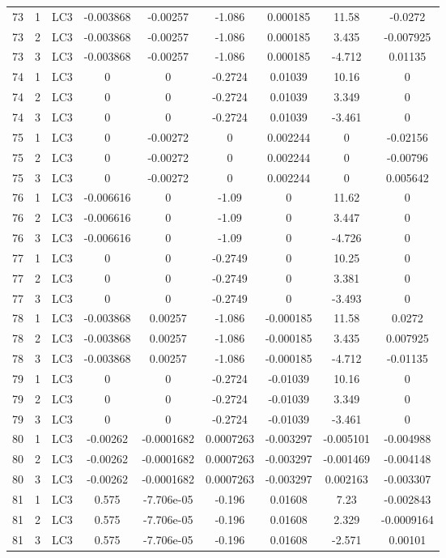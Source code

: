 \documentclass{article}%
\begin{document}
\begin{longtable}{| c c c | c c c c c c |}
73&1&LC3&{-}0.003868&{-}0.00257&{-}1.086&0.000185&11.58&{-}0.0272\\%
73&2&LC3&{-}0.003868&{-}0.00257&{-}1.086&0.000185&3.435&{-}0.007925\\%
73&3&LC3&{-}0.003868&{-}0.00257&{-}1.086&0.000185&{-}4.712&0.01135\\%
74&1&LC3&0&0&{-}0.2724&0.01039&10.16&0\\%
74&2&LC3&0&0&{-}0.2724&0.01039&3.349&0\\%
74&3&LC3&0&0&{-}0.2724&0.01039&{-}3.461&0\\%
75&1&LC3&0&{-}0.00272&0&0.002244&0&{-}0.02156\\%
75&2&LC3&0&{-}0.00272&0&0.002244&0&{-}0.00796\\%
75&3&LC3&0&{-}0.00272&0&0.002244&0&0.005642\\%
76&1&LC3&{-}0.006616&0&{-}1.09&0&11.62&0\\%
76&2&LC3&{-}0.006616&0&{-}1.09&0&3.447&0\\%
76&3&LC3&{-}0.006616&0&{-}1.09&0&{-}4.726&0\\%
77&1&LC3&0&0&{-}0.2749&0&10.25&0\\%
77&2&LC3&0&0&{-}0.2749&0&3.381&0\\%
77&3&LC3&0&0&{-}0.2749&0&{-}3.493&0\\%
78&1&LC3&{-}0.003868&0.00257&{-}1.086&{-}0.000185&11.58&0.0272\\%
78&2&LC3&{-}0.003868&0.00257&{-}1.086&{-}0.000185&3.435&0.007925\\%
78&3&LC3&{-}0.003868&0.00257&{-}1.086&{-}0.000185&{-}4.712&{-}0.01135\\%
79&1&LC3&0&0&{-}0.2724&{-}0.01039&10.16&0\\%
79&2&LC3&0&0&{-}0.2724&{-}0.01039&3.349&0\\%
79&3&LC3&0&0&{-}0.2724&{-}0.01039&{-}3.461&0\\%
80&1&LC3&{-}0.00262&{-}0.0001682&0.0007263&{-}0.003297&{-}0.005101&{-}0.004988\\%
80&2&LC3&{-}0.00262&{-}0.0001682&0.0007263&{-}0.003297&{-}0.001469&{-}0.004148\\%
80&3&LC3&{-}0.00262&{-}0.0001682&0.0007263&{-}0.003297&0.002163&{-}0.003307\\%
81&1&LC3&0.575&{-}7.706e{-}05&{-}0.196&0.01608&7.23&{-}0.002843\\%
81&2&LC3&0.575&{-}7.706e{-}05&{-}0.196&0.01608&2.329&{-}0.0009164\\%
81&3&LC3&0.575&{-}7.706e{-}05&{-}0.196&0.01608&{-}2.571&0.00101\\%

\end{longtable}
\end{document}
